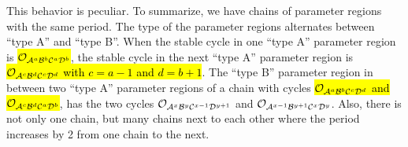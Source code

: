 This behavior is peculiar.
To summarize, we have chains of parameter regions with the same period.
The type of the parameter regions alternates between ``type A'' and ``type B''.
When the stable cycle in one ``type A'' parameter region is \hl{$\mathcal{O}_{\mathcal{A}^a\mathcal{B}^b\mathcal{C}^a\mathcal{D}^b}$}, the stable cycle in the next ``type A'' parameter region is \hl{$\mathcal{O}_{\mathcal{A}^{c}\mathcal{B}^{d}\mathcal{C}^{c}\mathcal{D}^{d}}$ with $c = a - 1$ and $d = b + 1$}.
The ``type B'' parameter region in between two ``type A'' parameter regions of a chain with cycles \hl{$\mathcal{O}_{\mathcal{A}^a\mathcal{B}^b\mathcal{C}^c\mathcal{D}^d}$ and $\mathcal{O}_{\mathcal{A}^{c}\mathcal{B}^{d}\mathcal{C}^{a}\mathcal{D}^{b}}$}, has the two cycles $\mathcal{O}_{\mathcal{A}^x\mathcal{B}^y\mathcal{C}^{x-1}\mathcal{D}^{y+1}}$ and $\mathcal{O}_{\mathcal{A}^{x-1}\mathcal{B}^{y+1}\mathcal{C}^x\mathcal{D}^y}$.
Also, there is not only one chain, but many chains next to each other where the period increases by 2 from one chain to the next.
